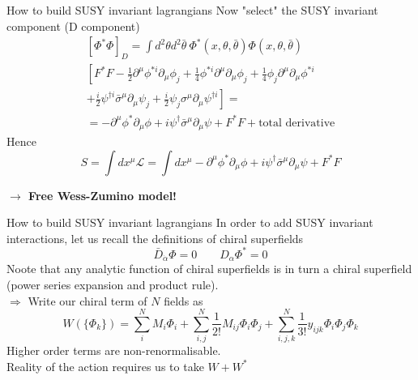 \documentclass[10pt]{beamer}
\begin{document}
\begin{frame}{How to build SUSY invariant lagrangians}
    Now "select" the SUSY invariant component (D component)
    \begin{gather*}
        \left[\Phi^*\Phi\right]_D = \int d^2\theta d^2\bar\theta \ \Phi^*(x, \theta, \bar\theta) \Phi(x, \theta, \bar\theta) \\
        \left[F^* F - \frac{1}{2} \partial^{\mu} \phi^{* i} \partial_{\mu} \phi_{j}+\frac{1}{4} \phi^{* i} \partial^{\mu} \partial_{\mu} \phi_{j}+\frac{1}{4} \phi_{j} \partial^{\mu} \partial_{\mu} \phi^{* i}\right. \\
                \left.+\frac{i}{2} \psi^{\dagger i} \bar{\sigma}^{\mu} \partial_{\mu} \psi_{j}+\frac{i}{2} \psi_{j} \sigma^{\mu} \partial_{\mu} \psi^{\dagger i}\right] = \\
        = -\partial^{\mu}\phi^*\partial_{\mu}\phi + i\psi^{\dagger}\bar\sigma^{\mu}\partial_{\mu}\psi + F^*F + \text{total derivative}
    \end{gather*}
    Hence 
    \begin{equation*}
        \boxed{S = \int dx^{\mu} \mathcal{L} = \int dx^{\mu} -\partial^{\mu}\phi^*\partial_{\mu}\phi + i\psi^{\dagger}\bar\sigma^{\mu}\partial_{\mu}\psi + F^*F}
    \end{equation*}
    \centerline{\bfseries $\rightarrow$ Free Wess-Zumino model!}
\end{frame}

\begin{frame}{How to build SUSY invariant lagrangians}
    In order to add SUSY invariant interactions, let us recall the definitions of chiral superfields 
    \begin{equation*}
        \bar D_{\dot\alpha} \Phi = 0 \qquad D_{\alpha} \Phi^* = 0
    \end{equation*}
        Noote that any analytic function of chiral superfields is in turn a chiral superfield (power series expansion and product rule). \\
        $\Rightarrow$ Write our chiral term of $N$ fields as 
        \begin{equation*}
            W(\{\Phi_k\}) = \sum_i^N M_i \Phi_i + \sum_{i,j}^N \frac{1}{2!} M_{ij} \Phi_{i}\Phi_j + \sum_{i,j,k}^N \frac{1}{3!} y_{ijk} \Phi_i \Phi_j \Phi_k
        \end{equation*}
        Higher order terms are non-renormalisable. \\
        Reality of the action requires us to take $W + W^*$
    
\end{frame}
\end{document}
